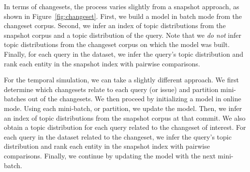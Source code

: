 In terms of changesets, the process varies slightly from a snapshot approach, as
shown in Figure~\ref{fig:changeset}.  First, we build a model in batch mode
from the changeset corpus.  Second, we infer an index of topic distributions
from the snapshot corpus and a topic distribution of the query.  Note that we
\emph{do not} infer topic distributions from the changeset corpus on which the
model was built.  Finally, for each query in the dataset, we infer the query's
topic distribution and rank each entity in the snapshot index with pairwise
comparisons.

For the temporal simulation, we can take a slightly different approach.  We
first determine which changesets relate to each query (or issue) and partition
mini-batches out of the changesets.  We then proceed by initializing a model in
online mode.  Using each mini-batch, or partition, we update the model.  Then,
we infer an index of topic distributions from the snapshot corpus at that
commit.  We also obtain a topic distribution for each query related to the
changeset of interest.  For each query in the dataset related to the changeset,
we infer the query's topic distribution and rank each entity in the snapshot
index with pairwise comparisons. Finally, we continue by updating the model with
the next mini-batch.

